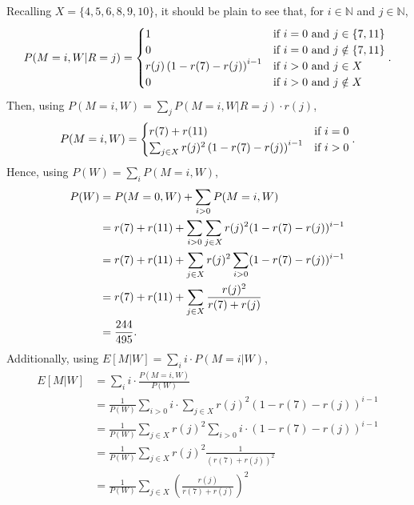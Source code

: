 \documentclass{article}
\begin{document}
\begin{enumerate}
\begin{enumerate}
        Recalling $X=\{4,5,6,8,9,10\}$, it should be plain to see that, for $i \in \mathbb{N}$ and $j \in \mathbb{N}$,
        \[
        P( M=i, W | R=j ) =
        \begin{cases}
            1                                       & \text{if } i = 0 \text{ and } j \in \{7,11\} \\
            0                                       & \text{if } i = 0 \text{ and } j \notin \{7,11\} \\
            r(j)\left(1-r(7)-r(j)\right)^{i-1}      & \text{if } i > 0 \text{ and } j \in X \\
            0                                       & \text{if } i > 0 \text{ and } j \notin X
        \end{cases}\text.
        \]
        Then, using $P(M=i,W) = \sum_jP(M=i,W|R=j)\cdot r(j)$,
        \[
        P(M=i,W) = 
        \begin{cases}
            r(7) + r(11)                                            & \text{if } i = 0 \\
            \sum_{j\in X}r(j)^2\left(1 - r(7) - r(j)\right)^{i-1}   & \text{if } i > 0
        \end{cases}\text.
        \]
        Hence, using $P(W) = \sum_iP(M=i, W)$,
        \[\begin{split}
        P(W) & = P(M=0, W) + \sum_{i>0}P(M=i, W) \\
             & = r(7) + r(11) + \sum_{i>0}\sum_{j\in X} r(j)^2(1-r(7)-r(j))^{i-1} \\
             & = r(7) + r(11) + \sum_{j\in X}r(j)^2\sum_{i>0} (1-r(7)-r(j))^{i-1} \\
             & = r(7) + r(11) + \sum_{j\in X} \frac{r(j)^2}{r(7)+r(j)} \\
             & = \frac{244}{495}\text.
        \end{split}\]
        Additionally, using $E[M|W]=\sum_i i \cdot P(M=i|W)$,
        \[\begin{split}
        E[M|W]  & = \sum_{i} i \cdot \frac{P(M=i, W)}{P(W)} \\
                & = \frac{1}{P(W)}\sum_{i>0} i \cdot \sum_{j\in X}r(j)^2(1-r(7)-r(j))^{i-1} \\
                & = \frac{1}{P(W)}\sum_{j\in X}r(j)^2\sum_{i>0}i\cdot(1-r(7)-r(j))^{i-1} \\
                & = \frac{1}{P(W)}\sum_{j\in X}r(j)^2\frac{1}{(r(7)+r(j))^2} \\
                & = \frac{1}{P(W)}\sum_{j\in X}\left(\frac{r(j)}{r(7)+r(j)}\right)^2 \\

\end{split}\]
\end{enumerate}
\end{enumerate}
\end{document}

